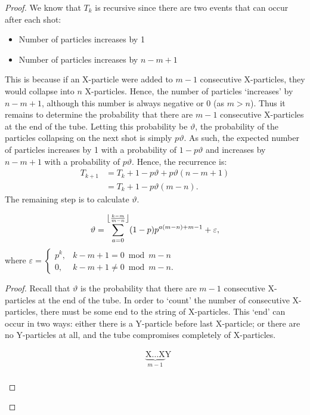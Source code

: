 \begin{proof}
  We know that $T_k$ is recursive since there are two events that can occur after each shot:
  \begin{itemize}
    \item Number of particles increases by 1
    \item Number of particles increases by $n-m+1$
  \end{itemize}
  This is because if an X-particle were added to $m-1$ consecutive X-particles, they would collapse into $n$ X-particles. Hence, the number of particles `increases' by $n-m+1$, although this number is always negative or 0 (as $m > n$). Thus it remains to determine the probability that there are $m-1$ consecutive X-particles at the end of the tube. Letting this probability be $\vartheta$, the probability of the particles collapsing on the next shot is simply $p\vartheta$. As such, the expected number of particles increases by 1 with a probability of  $1-p\vartheta$ and increases by  $n-m+1$ with a probability of $p\vartheta$. Hence, the recurrence is:
  \begin{align}
    T_{k+1} &= T_{k} + 1 - p\vartheta + p\vartheta(n-m+1) \nonumber \\
            &= T_{k} + 1 - p\vartheta(m-n). \label{eq:1}
  \end{align}
  The remaining step is to calculate $\vartheta$.
  \begin{claim}
    \begin{equation*}
      \vartheta = \sum_{a=0}^{\floor*{\frac{k-m}{m-n}}} (1-p)p^{a(m-n)+m-1} + \varepsilon,
    \end{equation*}
    where $\varepsilon = \begin{cases} p^{k}, &k-m+1 = 0 \bmod m-n \\ 0, &k-m+1 \neq 0 \bmod m-n. \end{cases}$
  \end{claim}
  \begin{proof}
    Recall that $\vartheta$ is the probability that there are $m-1$ consecutive X-particles at the end of the tube. In order to `count' the number of consecutive X-particles, there must be some end to the string of X-particles. This `end' can occur in two ways: either there is a Y-particle before last X-particle; or there are no Y-particles at all, and the tube compromises completely of X-particles.
    \begin{figure}[H]
      \vspace{-1.5em}
      \begin{align*}
        &\underbrace{\text{X}\dots\text{X}}_{m-1}\text{Y} \tag{A}\\

\end{align*}
\end{figure}
\end{proof}
\end{proof}
